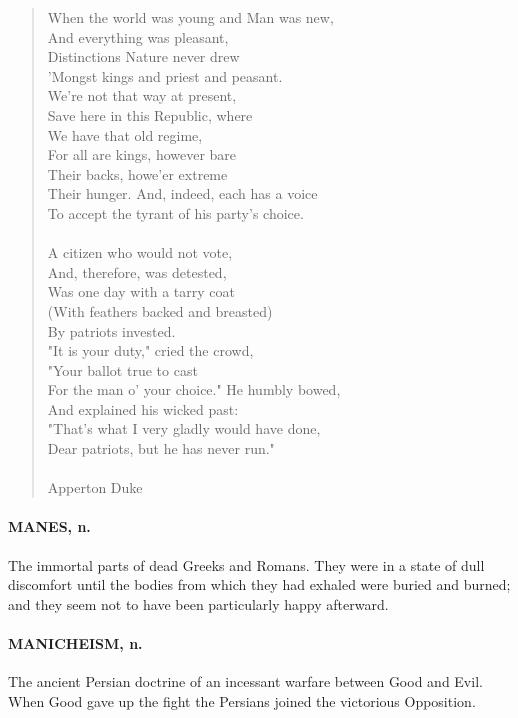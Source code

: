 \documentclass[11pt]{article}
\begin{document}
\begin{quote}   When the world was young and Man was new, \\
      And everything was pleasant, \\
  Distinctions Nature never drew \\
      'Mongst kings and priest and peasant. \\
      We're not that way at present, \\
  Save here in this Republic, where \\
      We have that old regime, \\
  For all are kings, however bare \\
      Their backs, howe'er extreme \\
  Their hunger.  And, indeed, each has a voice \\
  To accept the tyrant of his party's choice. \\
 \\
  A citizen who would not vote, \\
      And, therefore, was detested, \\
  Was one day with a tarry coat \\
      (With feathers backed and breasted) \\
      By patriots invested. \\
  "It is your duty," cried the crowd, \\
      "Your ballot true to cast \\
  For the man o' your choice."  He humbly bowed, \\
      And explained his wicked past: \\
  "That's what I very gladly would have done, \\
  Dear patriots, but he has never run." \\
 \\
Apperton Duke \end{quote}


\paragraph{MANES, n.}  The immortal parts of dead Greeks and Romans.  They were in
a state of dull discomfort until the bodies from which they had
exhaled were buried and burned; and they seem not to have been
particularly happy afterward.

\paragraph{MANICHEISM, n.}  The ancient Persian doctrine of an incessant warfare
between Good and Evil.  When Good gave up the fight the Persians
joined the victorious Opposition.
\end{document}

